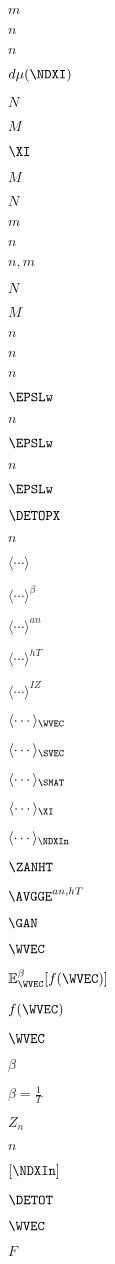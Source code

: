$m$

$n$

$n$

$d\mu(\NDXI)$

$N$

$M$

$\XI$

$M$

$N$

$m$

$n$

$n,m$

$N$

$M$

$n$

$n$

$n$

$\EPSLw$

$n$

$\EPSLw$

$n$

$\EPSLw$

$\DETOPX$

$n$

$\langle\cdots\rangle$

$\langle\cdots\rangle^{\beta}$

$\langle\cdots\rangle^{an}$

$\langle\cdots\rangle^{hT}$

$\langle\cdots\rangle^{IZ}$

$\langle\cdots\rangle_{\WVEC}$

$\langle\cdots\rangle_{\SVEC}$

$\langle\cdots\rangle_{\SMAT}$

$\langle\cdots\rangle_{\XI}$

$\langle\cdots\rangle_{\NDXIn}$

$\ZANHT$

$\AVGGE^{an,hT}$

$\GAN$

$\WVEC$

$\mathbb{E}^{\beta}_{\WVEC}[f(\WVEC)]$

$f(\WVEC)$

$\WVEC$

$\beta$

$\beta=\frac{1}{T}$

$Z_{n}$

$n$

$[\NDXIn]$

$\DETOT$

$\WVEC$

$F$

